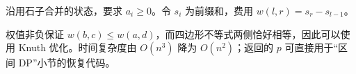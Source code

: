 沿用石子合并的状态，要求 $a_i\ge0$。令 $s_i$ 为前缀和，费用 $w(l,r)=s_r-s_{l-1}$。

权值非负保证 $w(b,c)\le w(a,d)$，而四边形不等式两侧恰好相等，因此可以使用 Knuth 优化。时间复杂度由 $O(n^3)$ 降为 $O(n^2)$；返回的 $p$ 可直接用于“区间 DP”小节的恢复代码。
